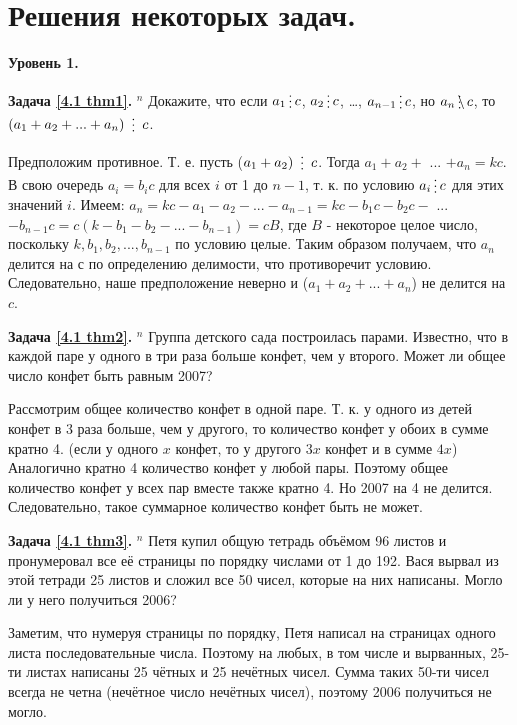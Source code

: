 \newpage

\section{Решения некоторых задач.}

\begin{center}
\textbf{Уровень 1.}
\end{center} 

\textbf{Задача \ref{4.1 thm1}.} $^n$
	Докажите, что если $a_1 \del c$, $a_2 \del c$, …, $a_{n-1} \del c$, но $a_n \ndel c$, то $(a_1 + a_2 + ... + a_n) \nskdel c$.
\begin{prf}
    Предположим противное. Т. е. пусть ($a_1+a_2) \skdel c$. Тогда $a_1 + a_2 +$ ... $+ a_n = kc$. В свою очередь $a_i = b_i c$ для всех $i$ от 1 до $n-1$, т. к. по условию $a_i \del c$ для этих значений $i$. Имеем: $a_n = kc - a_1 - a_2 -...- a_{n-1} = kc - b_1 c - b_2 c -$ ... $- b_{n-1}c = c(k - b_1 - b_2 -...- b_{n-1}) = cB$, где $B$ - некоторое целое число, поскольку $k, b_1, b_2,..., b_{n-1}$ по условию целые. 
    Таким образом получаем, что $a_n$ делится на $с$ по определению делимости, что противоречит условию. Следовательно, наше предположение неверно и ($a_1 + a_2 + ... + a_n$) не делится на $c$.
\end{prf}

\textbf{Задача \ref{4.1 thm2}.} $^n$
    Группа детского сада построилась парами. Известно, что в каждой паре у одного в три раза больше конфет, чем у второго. Может ли общее число конфет быть равным 2007?
\begin{prf}
    Рассмотрим общее количество конфет в одной паре. Т. к. у одного из детей конфет в 3 раза больше, чем у другого, то количество конфет у обоих в сумме кратно 4. (если у одного $x$ конфет, то у другого $3x$ конфет и в сумме $4x$) Аналогично кратно 4 количество конфет у любой пары. Поэтому общее количество конфет у всех пар вместе также кратно 4. Но 2007 на 4 не делится. Следовательно, такое суммарное количество конфет быть не может.
\end{prf}

\textbf{Задача \ref{4.1 thm3}.} $^n$
    Петя купил общую тетрадь объёмом 96 листов и пронумеровал все её страницы по порядку числами от 1 до 192. Вася вырвал из этой тетради 25 листов и сложил все 50 чисел, которые на них написаны. Могло ли у него получиться 2006?
\begin{prf}
    Заметим, что нумеруя страницы по порядку, Петя написал на страницах одного листа последовательные числа. Поэтому на любых, в том числе и вырванных, 25-ти листах написаны 25 чётных и 25 нечётных чисел. Сумма таких 50-ти чисел всегда не четна (нечётное число нечётных чисел), поэтому 2006 получиться не могло.
\end{prf}

